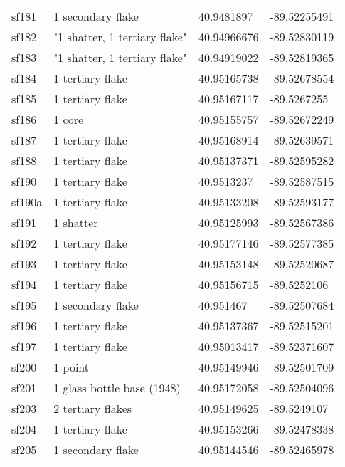 \begin{longtable}{p{1cm}p{6cm}ll}
	sf181 & 1 secondary flake & 40.9481897 & -89.52255491\\
	sf182 & "1 shatter, 1 tertiary flake" & 40.94966676 & -89.52830119\\
	sf183 & "1 shatter, 1 tertiary flake" & 40.94919022 & -89.52819365\\
	sf184 & 1 tertiary flake & 40.95165738 & -89.52678554\\
	sf185 & 1 tertiary flake & 40.95167117 & -89.5267255\\
	sf186 & 1 core & 40.95155757 & -89.52672249\\
	sf187 & 1 tertiary flake & 40.95168914 & -89.52639571\\
	sf188 & 1 tertiary flake & 40.95137371 & -89.52595282\\

	sf190 & 1 tertiary flake & 40.9513237 & -89.52587515\\
	sf190a & 1 tertiary flake & 40.95133208 & -89.52593177\\
	sf191 & 1 shatter & 40.95125993 & -89.52567386\\
	sf192 & 1 tertiary flake & 40.95177146 & -89.52577385\\
	sf193 & 1 tertiary flake & 40.95153148 & -89.52520687\\
	sf194 & 1 tertiary flake & 40.95156715 & -89.5252106\\
	sf195 & 1 secondary flake & 40.951467 & -89.52507684\\
	sf196 & 1 tertiary flake & 40.95137367 & -89.52515201\\
	sf197 & 1 tertiary flake & 40.95013417 & -89.52371607\\

	sf200 & 1 point & 40.95149946 & -89.52501709\\
	sf201 & 1 glass bottle base (1948) & 40.95172058 & -89.52504096\\
	sf203 & 2 tertiary flakes & 40.95149625 & -89.5249107\\
	sf204 & 1 tertiary flake & 40.95153266 & -89.52478338\\
	sf205 & 1 secondary flake & 40.95144546 & -89.52465978\\


\end{longtable}
